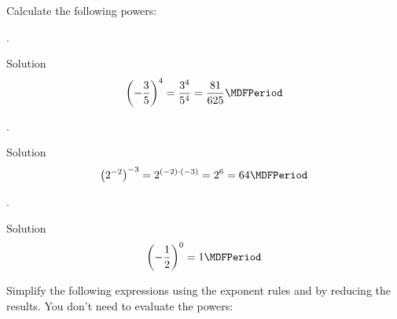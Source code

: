 \begin{MExercises}

\begin{MExercise}
Calculate the following powers:
\begin{MExerciseItems}
\item{.\\\begin{MHint}{Solution} $$\left(-\Mdfrac{3}{5}\right)^4=\Mdfrac{3^4}{5^4}=\Mdfrac{81}{625} \MDFPeriod$$\end{MHint}}
\item{.\\\begin{MHint}{Solution} $$\left(2^{-2}\right)^{-3}=2^{(-2)\cdot(-3)}=2^6=64 \MDFPeriod$$\end{MHint}}
\item{.\\\begin{MHint}{Solution} $$\left(-\Mdfrac{1}{2}\right)^0=1 \MDFPeriod$$\end{MHint}}
\end{MExerciseItems}
\end{MExercise}

\begin{MExercise}
Simplify the following expressions using the exponent rules and by reducing the results. You don't need to evaluate the powers:


\end{MExercise}
\end{MExercises}
